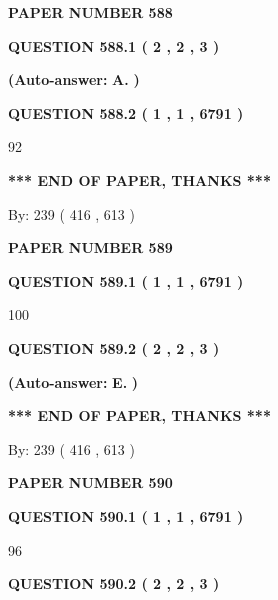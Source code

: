 \documentclass[12pt]{article}
\begin{document}
   
\newpage 
\setcounter{page}{ 
   588001 } 
   
   
 {\textbf{ \Large{ PAPER NUMBER  588  }}}
   
   
   
   
  
  
{\textbf{\large{QUESTION
588.1 
 ( 2 , 2 , 3 )
}}}
 
 
{\textbf{(Auto-answer:}}
{\textbf{\large{
A.}}}
{\textbf{)}}
 
 
  
  
{\textbf{\large{QUESTION
588.2 
 ( 1 , 1 , 6791 )
}}}

92
   
   
   
   
\vspace{1.0in} 
{\textbf{\large{ *** END OF PAPER, THANKS *** }}} 
   
   
\hspace{1.0in} By: 
 239 ( 416 ,  613 )
   
   
   
   
\newpage 
\setcounter{page}{ 
   589001 } 
   
   
 {\textbf{ \Large{ PAPER NUMBER  589  }}}
   
   
   
   
  
  
{\textbf{\large{QUESTION
589.1 
 ( 1 , 1 , 6791 )
}}}

100
  
  
{\textbf{\large{QUESTION
589.2 
 ( 2 , 2 , 3 )
}}}
 
 
{\textbf{(Auto-answer:}}
{\textbf{\large{
E.}}}
{\textbf{)}}
 
 
   
   
   
   
\vspace{1.0in} 
{\textbf{\large{ *** END OF PAPER, THANKS *** }}} 
   
   
\hspace{1.0in} By: 
 239 ( 416 ,  613 )
   
   
   
   
\newpage 
\setcounter{page}{ 
   590001 } 
   
   
 {\textbf{ \Large{ PAPER NUMBER  590  }}}
   
   
   
   
  
  
{\textbf{\large{QUESTION
590.1 
 ( 1 , 1 , 6791 )
}}}

96
  
  
{\textbf{\large{QUESTION
590.2 
 ( 2 , 2 , 3 )
}}}
 
\end{document}
